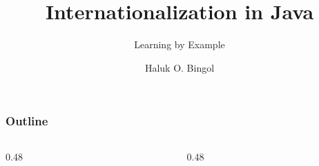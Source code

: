 \documentclass[aspectratio=169,10pt,compress]{beamer}
\title{Internationalization in Java}
\subtitle{Learning by Example}
\author[Bingol]{Haluk O. Bingol}
\institute[FCIS]{
    Faculty of Computer and Information Sciences\\
    Yeditepe University
}
\date{
	{\tiny \hbTimeStamp}
}
\begin{document}
\begin{frame}[t,fragile]
  \titlepage
\end{frame}




\begin{frame}[t,fragile] \frametitle{Outline}
  \begin{columns}[T]
    \begin{column}{0.48\textwidth}
      \tableofcontents[sections={1-3}, hideallsubsections]
    \end{column}
    \begin{column}{0.48\textwidth}
      \tableofcontents[sections={4-20}, hideallsubsections]
    \end{column}
  \end{columns}
\end{frame}
\end{document}
